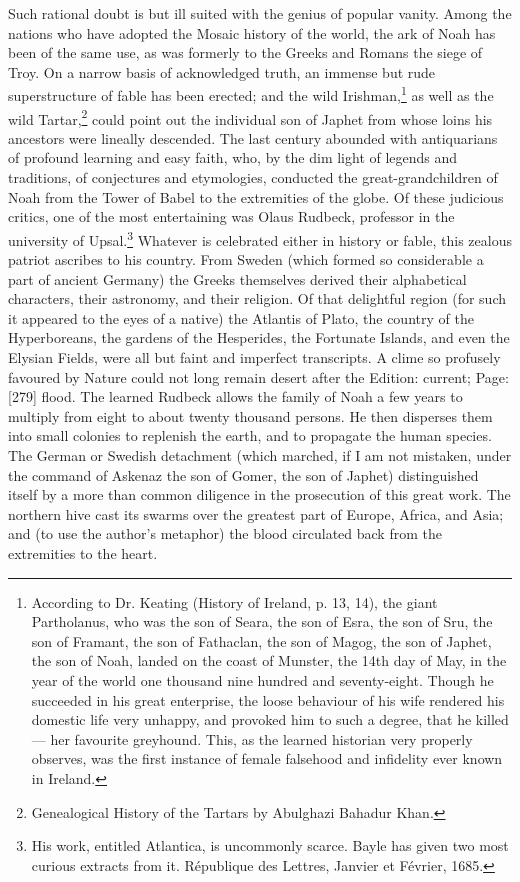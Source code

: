 Such rational doubt is but ill suited with the genius of popular vanity. Among the nations who have adopted the Mosaic history of the world, the ark of Noah has been of the same use, as was formerly to the Greeks and Romans the siege of Troy. On a narrow basis of acknowledged truth, an immense but rude superstructure of fable has been erected; and the wild Irishman,\footnote{According to Dr. Keating (History of Ireland, p. 13, 14), the giant Partholanus, who was the son of Seara, the son of Esra, the son of Sru, the son of Framant, the son of Fathaclan, the son of Magog, the son of Japhet, the son of Noah, landed on the coast of Munster, the 14th day of May, in the year of the world one thousand nine hundred and seventy-eight. Though he succeeded in his great enterprise, the loose behaviour of his wife rendered his domestic life very unhappy, and provoked him to such a degree, that he killed \texthebrew{—} her favourite greyhound. This, as the learned historian very properly observes, was the first instance of female falsehood and infidelity ever known in Ireland.} as well as the wild Tartar,\footnote{Genealogical History of the Tartars by Abulghazi Bahadur Khan.} could point out the individual son of Japhet from whose loins his ancestors were lineally descended. The last century abounded with antiquarians of profound learning and easy faith, who, by the dim light of legends and traditions, of conjectures and etymologies, conducted the great-grandchildren of Noah from the Tower of Babel to the extremities of the globe. Of these judicious critics, one of the most entertaining was Olaus Rudbeck, professor in the university of Upsal.\footnote{His work, entitled Atlantica, is uncommonly scarce. Bayle has given two most curious extracts from it. République des Lettres, Janvier et Février, 1685.} Whatever is celebrated either in history or fable, this zealous patriot ascribes to his country. From Sweden (which formed so considerable a part of ancient Germany) the Greeks themselves derived their alphabetical characters, their astronomy, and their religion. Of that delightful region (for such it appeared to the eyes of a native) the Atlantis of Plato, the country of the Hyperboreans, the gardens of the Hesperides, the Fortunate Islands, and even the Elysian Fields, were all but faint and imperfect transcripts. A clime so profusely favoured by Nature could not long remain desert after the Edition: current; Page: [279] flood. The learned Rudbeck allows the family of Noah a few years to multiply from eight to about twenty thousand persons. He then disperses them into small colonies to replenish the earth, and to propagate the human species. The German or Swedish detachment (which marched, if I am not mistaken, under the command of Askenaz the son of Gomer, the son of Japhet) distinguished itself by a more than common diligence in the prosecution of this great work. The northern hive cast its swarms over the greatest part of Europe, Africa, and Asia; and (to use the author\texthebrew{}’s metaphor) the blood circulated back from the extremities to the heart.

